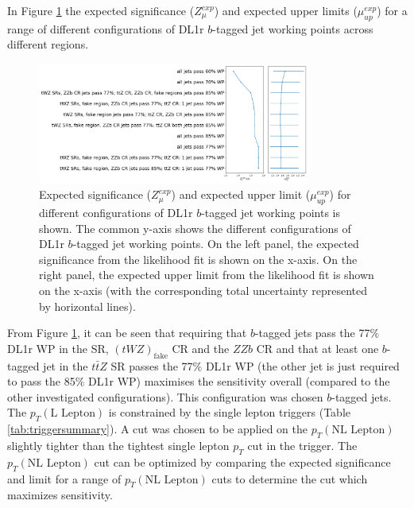 In Figure \ref{fig:4lep-btagWP-optimization} the expected significance ($Z_{\mu}^{exp}$) and expected upper limits ($\mu_{up}^{exp}$) for a range of different configurations of DL1r $b$-tagged jet working points across different regions.
\begin{figure}[h!]
	\includegraphics[width = 0.8\textwidth]{figures/btagWP_optimization.png}
  \centering
	\caption{Expected significance ($Z_{\mu}^{exp}$) and expected upper limit ($\mu_{up}^{exp}$) for different configurations of DL1r $b$-tagged jet working points is shown. The common y-axis shows the different configurations of DL1r $b$-tagged jet working points. On the left panel, the expected significance from the likelihood fit is shown on the x-axis. On the right panel, the expected upper limit from the likelihood fit is shown on the x-axis (with the corresponding total uncertainty represented by horizontal lines).}
	\label{fig:4lep-btagWP-optimization}
\end{figure}

From Figure \ref{fig:4lep-btagWP-optimization}, it can be seen that requiring that $b$-tagged jets pass the 77$\%$ DL1r WP in the \tWZ SR, $(tWZ)_{\text{fake}}$ CR and the $ZZb$ CR and that at least one $b$-tagged jet in the $t\bar{t}Z$ SR passes the 77$\%$ DL1r WP (the other jet is just required to pass the 85$\%$ DL1r WP) maximises the sensitivity overall (compared to the other investigated configurations). This configuration was chosen $b$-tagged jets.\\

The $p_{T}(\text{L Lepton})$ is constrained by the single lepton triggers (Table \ref{tab:triggersummary}). A cut was chosen to be applied on the $p_{T}(\text{NL Lepton})$ slightly tighter than the tightest single lepton $p_{T}$ cut in the trigger. The $p_{T}(\text{NL Lepton})$ cut can be optimized by comparing the expected significance and limit for a range of $p_{T}{(\text{NL Lepton})}$ cuts to determine the cut which maximizes sensitivity.\\

